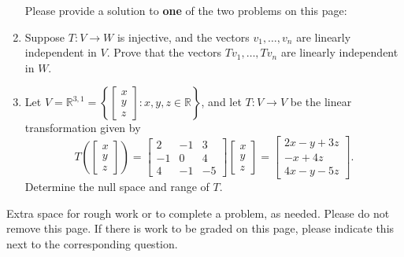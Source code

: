 \documentclass[12pt]{article}
\newcommand{\points}[1]{\marginpar{\hspace{24pt}[#1]}}
\newcommand{\R}{\mathbb{R}}
\begin{document}
\begin{enumerate}
\newpage
Please provide a solution to {\bf one} of the two problems on this page:
\item Suppose $T:V\to W$ is injective, and the vectors $v_1,\ldots, v_n$ are linearly independent in $V$. Prove that the vectors $Tv_1,\ldots, Tv_n$ are linearly independent in $W$. \points{10}
\item Let $V=\R^{3,1} = \left\{\begin{bmatrix}x\\y\\z\end{bmatrix} : x,y,z\in\R\right\}$, and let $T:V\to V$ be the linear transformation given by\points{10}
\[
T\left(\begin{bmatrix}x\\y\\z\end{bmatrix}\right) = \begin{bmatrix}2&-1&3\\-1&0&4\\4&-1&-5\end{bmatrix}\begin{bmatrix}
x\\y\\z
\end{bmatrix}=\begin{bmatrix}
2x-y+3z\\-x+4z\\4x-y-5z
\end{bmatrix}.
\]
Determine the null space and range of $T$.
\end{enumerate}
\newpage

Extra space for rough work or to complete a problem, as needed. Please do not remove this page. If there is work to be graded on this page, please indicate this next to the corresponding question.
\end{document}
